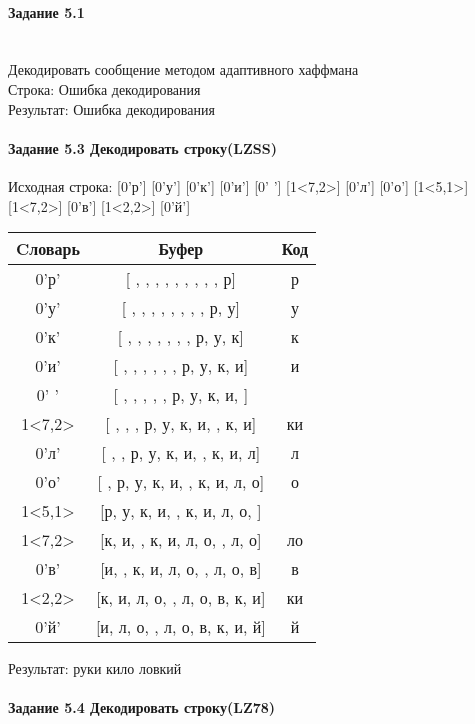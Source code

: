 \documentclass[a4paper, 12pt]{article}
\begin{document}
\paragraph{Задание 5.1}

\\ 

Декодировать сообщение методом адаптивного хаффмана \\
Строка: 
Ошибка декодирования\\
Результат: Ошибка декодирования
\pagebreak
\paragraph{Задание 5.3 Декодировать строку(LZSS)\\}

Исходная строка: [0'р'] [0'у'] [0'к'] [0'и'] [0' '] [1<7,2>] [0'л'] [0'о'] [1<5,1>] [1<7,2>] [0'в'] [1<2,2>] [0'й']\\
\begin{table}[h!]
\centering
\begin{tabular}{|c|c|c|}
\hline
 Cловарь & Буфер & Код  \\ \hline
0'р' & [ ,  ,  ,  ,  ,  ,  ,  ,  , р] & р
\\ \hline
0'у' & [ ,  ,  ,  ,  ,  ,  ,  , р, у] & у
\\ \hline
0'к' & [ ,  ,  ,  ,  ,  ,  , р, у, к] & к
\\ \hline
0'и' & [ ,  ,  ,  ,  ,  , р, у, к, и] & и
\\ \hline
0' ' & [ ,  ,  ,  ,  , р, у, к, и,  ] &  
\\ \hline
1<7,2> & [ ,  ,  , р, у, к, и,  , к, и] & ки
\\ \hline
0'л' & [ ,  , р, у, к, и,  , к, и, л] & л
\\ \hline
0'о' & [ , р, у, к, и,  , к, и, л, о] & о
\\ \hline
1<5,1> & [р, у, к, и,  , к, и, л, о,  ] &  
\\ \hline
1<7,2> & [к, и,  , к, и, л, о,  , л, о] & ло
\\ \hline
0'в' & [и,  , к, и, л, о,  , л, о, в] & в
\\ \hline
1<2,2> & [к, и, л, о,  , л, о, в, к, и] & ки
\\ \hline
0'й' & [и, л, о,  , л, о, в, к, и, й] & й
\\ \hline
\end{tabular}
\end{table}

Результат: руки кило ловкий
\pagebreak
\paragraph{Задание 5.4 Декодировать строку(LZ78)\\}
\end{document}
